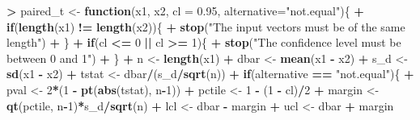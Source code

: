 \documentclass[]{krantz}
\makeatletter
\newenvironment{Shaded}{\begin{snugshade}}{\end{snugshade}}
\newcommand{\KeywordTok}[1]{\textcolor[rgb]{0.27,0.27,0.27}{\textbf{#1}}}
\newcommand{\DataTypeTok}[1]{\textcolor[rgb]{0.27,0.27,0.27}{#1}}
\newcommand{\DecValTok}[1]{\textcolor[rgb]{0.06,0.06,0.06}{#1}}
\newcommand{\FloatTok}[1]{\textcolor[rgb]{0.06,0.06,0.06}{#1}}
\newcommand{\StringTok}[1]{\textcolor[rgb]{0.5,0.5,0.5}{#1}}
\newcommand{\ControlFlowTok}[1]{\textcolor[rgb]{0.27,0.27,0.27}{\textbf{#1}}}
\newcommand{\OperatorTok}[1]{\textcolor[rgb]{0.43,0.43,0.43}{\textbf{#1}}}
\newcommand{\NormalTok}[1]{#1}
\newenvironment{kframe}{%
\medskip{}
\setlength{\fboxsep}{.8em}
 \def\at@end@of@kframe{}%
 \ifinner\ifhmode%
  \def\at@end@of@kframe{\end{minipage}}%
  \begin{minipage}{\columnwidth}%
 \fi\fi%
 \def\FrameCommand##1{\hskip\@totalleftmargin \hskip-\fboxsep
 \colorbox{shadecolor}{##1}\hskip-\fboxsep
     \hskip-\linewidth \hskip-\@totalleftmargin \hskip\columnwidth}%
 \MakeFramed {\advance\hsize-\width
   \@totalleftmargin\z@ \linewidth\hsize
   \@setminipage}}%
 {\par\unskip\endMakeFramed%
 \at@end@of@kframe}
\renewenvironment{Shaded}{\begin{kframe}}{\end{kframe}}
\makeatother
\begin{document}
\begin{Shaded}
\begin{Highlighting}[]
\OperatorTok{>}\StringTok{ }\NormalTok{paired_t <-}\StringTok{ }\ControlFlowTok{function}\NormalTok{(x1, x2, }\DataTypeTok{cl =} \FloatTok{0.95}\NormalTok{, }\DataTypeTok{alternative=}\StringTok{"not.equal"}\NormalTok{)\{}
\OperatorTok{+}\StringTok{     }\ControlFlowTok{if}\NormalTok{(}\KeywordTok{length}\NormalTok{(x1) }\OperatorTok{!=}\StringTok{ }\KeywordTok{length}\NormalTok{(x2))\{}
\OperatorTok{+}\StringTok{         }\KeywordTok{stop}\NormalTok{(}\StringTok{"The input vectors must be of the same length"}\NormalTok{)}
\OperatorTok{+}\StringTok{         }\NormalTok{\}}
\OperatorTok{+}\StringTok{     }\ControlFlowTok{if}\NormalTok{(cl }\OperatorTok{<=}\StringTok{ }\DecValTok{0} \OperatorTok{||}\StringTok{ }\NormalTok{cl }\OperatorTok{>=}\StringTok{ }\DecValTok{1}\NormalTok{)\{}
\OperatorTok{+}\StringTok{         }\KeywordTok{stop}\NormalTok{(}\StringTok{"The confidence level must be between 0 and 1"}\NormalTok{)}
\OperatorTok{+}\StringTok{         }\NormalTok{\}}
\OperatorTok{+}\StringTok{     }\NormalTok{n <-}\StringTok{ }\KeywordTok{length}\NormalTok{(x1)}
\OperatorTok{+}\StringTok{     }\NormalTok{dbar <-}\StringTok{ }\KeywordTok{mean}\NormalTok{(x1 }\OperatorTok{-}\StringTok{ }\NormalTok{x2)}
\OperatorTok{+}\StringTok{     }\NormalTok{s_d <-}\StringTok{ }\KeywordTok{sd}\NormalTok{(x1 }\OperatorTok{-}\StringTok{ }\NormalTok{x2)}
\OperatorTok{+}\StringTok{     }\NormalTok{tstat <-}\StringTok{ }\NormalTok{dbar}\OperatorTok{/}\NormalTok{(s_d}\OperatorTok{/}\KeywordTok{sqrt}\NormalTok{(n))}
\OperatorTok{+}\StringTok{     }\ControlFlowTok{if}\NormalTok{(alternative }\OperatorTok{==}\StringTok{ "not.equal"}\NormalTok{)\{}
\OperatorTok{+}\StringTok{         }\NormalTok{pval <-}\StringTok{ }\DecValTok{2}\OperatorTok{*}\NormalTok{(}\DecValTok{1} \OperatorTok{-}\StringTok{ }\KeywordTok{pt}\NormalTok{(}\KeywordTok{abs}\NormalTok{(tstat), n}\OperatorTok{-}\DecValTok{1}\NormalTok{))}
\OperatorTok{+}\StringTok{         }\NormalTok{pctile <-}\StringTok{ }\DecValTok{1} \OperatorTok{-}\StringTok{ }\NormalTok{(}\DecValTok{1} \OperatorTok{-}\StringTok{ }\NormalTok{cl)}\OperatorTok{/}\DecValTok{2}
\OperatorTok{+}\StringTok{         }\NormalTok{margin <-}\StringTok{ }\KeywordTok{qt}\NormalTok{(pctile, n}\OperatorTok{-}\DecValTok{1}\NormalTok{)}\OperatorTok{*}\NormalTok{s_d}\OperatorTok{/}\KeywordTok{sqrt}\NormalTok{(n)}
\OperatorTok{+}\StringTok{         }\NormalTok{lcl <-}\StringTok{ }\NormalTok{dbar }\OperatorTok{-}\StringTok{ }\NormalTok{margin}
\OperatorTok{+}\StringTok{         }\NormalTok{ucl <-}\StringTok{ }\NormalTok{dbar }\OperatorTok{+}\StringTok{ }\NormalTok{margin}

\end{Highlighting}
\end{Shaded}
\end{document}
